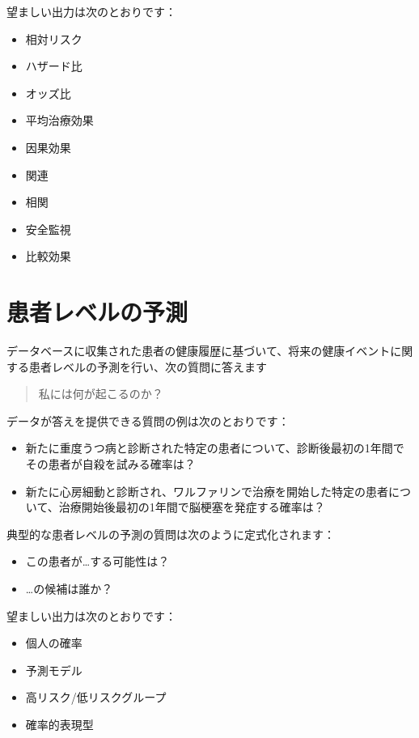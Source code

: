 \documentclass[
  11pt]{book}
\providecommand{\tightlist}{%
  \setlength{\itemsep}{0pt}\setlength{\parskip}{0pt}}
\theoremstyle{definition}
\theoremstyle{definition}
\theoremstyle{definition}
\theoremstyle{definition}
\theoremstyle{remark}
\begin{document}
望ましい出力は次のとおりです：

\begin{itemize}
\tightlist
\item
  相対リスク
\item
  ハザード比
\item
  オッズ比
\item
  平均治療効果
\item
  因果効果
\item
  関連
\item
  相関
\item
  安全監視
\item
  比較効果
\end{itemize}

\section{患者レベルの予測}\label{ux60a3ux8005ux30ecux30d9ux30ebux306eux4e88ux6e2c}


データベースに収集された患者の健康履歴に基づいて、将来の健康イベントに関する患者レベルの予測を行い、次の質問に答えます

\begin{quote}
私には何が起こるのか？
\end{quote}

データが答えを提供できる質問の例は次のとおりです：

\begin{itemize}
\tightlist
\item
  新たに重度うつ病と診断された特定の患者について、診断後最初の1年間でその患者が自殺を試みる確率は？
\item
  新たに心房細動と診断され、ワルファリンで治療を開始した特定の患者について、治療開始後最初の1年間で脳梗塞を発症する確率は？
\end{itemize}

典型的な患者レベルの予測の質問は次のように定式化されます：

\begin{itemize}
\tightlist
\item
  この患者が\ldots する可能性は？
\item
  \ldots の候補は誰か？
\end{itemize}

望ましい出力は次のとおりです：

\begin{itemize}
\tightlist
\item
  個人の確率
\item
  予測モデル
\item
  高リスク/低リスクグループ
\item
  確率的表現型
\end{itemize}
\end{document}
